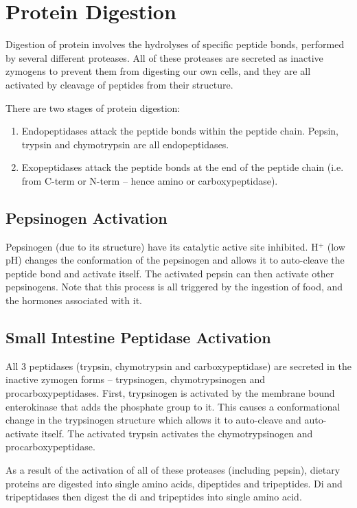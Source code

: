 \documentclass[a4paper, 12pt]{report}
\begin{document}
\section{Protein Digestion}

Digestion of protein involves the hydrolyses of specific peptide bonds, performed by several different proteases.
All of these proteases are secreted as inactive zymogens to prevent them from digesting our own cells, and they are all activated by cleavage of peptides from their structure.

There are two stages of protein digestion:
\begin{enumerate}
\item Endopeptidases attack the peptide bonds within the peptide chain. Pepsin, trypsin and chymotrypsin are all endopeptidases.
\item Exopeptidases attack the peptide bonds at the end of the peptide chain (i.e. from C-term or N-term -- hence amino or carboxypeptidase).
\end{enumerate}

\subsection{Pepsinogen Activation}

Pepsinogen (due to its structure) have its catalytic active site inhibited.
H$^+$ (low pH) changes the conformation of the pepsinogen and allows it to auto-cleave the peptide bond and activate itself.
The activated pepsin can then activate other pepsinogens.
Note that this process is all triggered by the ingestion of food, and the hormones associated with it.

\subsection{Small Intestine Peptidase Activation}

All 3 peptidases (trypsin, chymotrypsin and carboxypeptidase) are secreted in the inactive zymogen forms -- trypsinogen, chymotrypsinogen and procarboxypeptidases.
First, trypsinogen is activated by the membrane bound enterokinase that adds the phosphate group to it.
This causes a conformational change in the trypsinogen structure which allows it to auto-cleave and auto-activate itself.
The activated trypsin activates the chymotrypsinogen and procarboxypeptidase.

As a result of the activation of all of these proteases (including pepsin), dietary proteins are digested into single amino acids, dipeptides and tripeptides.
Di and tripeptidases then digest the di and tripeptides into single amino acid.
\end{document}

